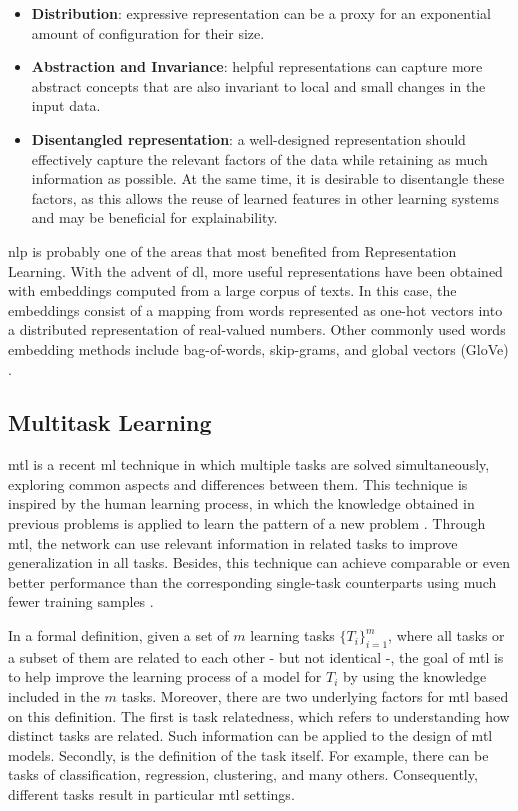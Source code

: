 \begin{itemize}
\item \textbf{Distribution}: expressive representation can be a proxy for an exponential amount of configuration for their size.

\item \textbf{Abstraction and Invariance}: helpful representations can capture more abstract concepts that are also invariant to local and small changes in the input data.

\item \textbf{Disentangled representation}: a well-designed representation should effectively capture the relevant factors of the data while retaining as much information as possible. At the same time, it is desirable to disentangle these factors, as this allows the reuse of learned features in other learning systems and may be beneficial for explainability. 
\end{itemize}

\acf{nlp} is probably one of the areas that most benefited from Representation Learning. With the advent of \acl{dl}, more useful representations have been obtained with embeddings computed from a large corpus of texts. In this case, the embeddings consist of a mapping from words represented as one-hot vectors into a distributed representation of real-valued numbers. Other commonly used words embedding methods include bag-of-words, skip-grams, and global vectors (GloVe) \citep{pennington2014glove, mikolov2013efficient}.

\subsection{Multitask Learning}

\acf{mtl} is a recent \acl{ml} technique in which multiple tasks are solved simultaneously, exploring common aspects and differences between them. This technique is inspired by the human learning process, in which the knowledge obtained in previous problems is applied to learn the pattern of a new problem \citep{zhang2017survey}. Through \acs{mtl}, the network can use relevant information in related tasks to improve generalization in all tasks. Besides, this technique can achieve comparable or even better performance than the corresponding single-task counterparts using much fewer training samples \citep{domhan2017using, singla2018multi}.

In a formal definition, given a set of $m$ learning tasks $\{T_i\}_{i=1}^m$, where all tasks or a subset of them are related to each other - but not identical -, the goal of \acs{mtl} is to help improve the learning process of a model for $T_i$ by using the knowledge included in the $m$ tasks. Moreover, there are two underlying factors for \acs{mtl} based on this definition. The first is task relatedness, which refers to understanding how distinct tasks are related. Such information can be applied to the design of \acs{mtl} models. Secondly, is the definition of the task itself. For example, there can be tasks of classification, regression, clustering, and many others. Consequently, different tasks result in particular \acs{mtl} settings.

